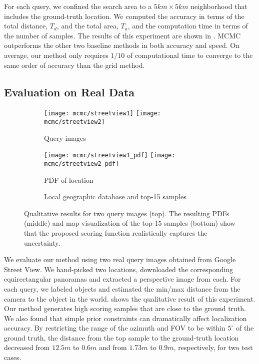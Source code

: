 For each query, we confined the search area to a $5km\times5km$ 
neighborhood that includes the ground-truth location. We computed the
accuracy in terms of the total distance, $T_d$, and the
total area, $T_a$, and the computation time in terms of
the number of samples. The results of this experiment are shown in
. MCMC outperforms the other two baseline methods
in both accuracy and speed. On average, our method only requires
$1/10$ of computational time to converge to the same order of accuracy
than the grid method.

\subsection{Evaluation on Real Data}
\label{sec:qualitative}

\begin{figure}
  
  \centering

  \begin{subfigure}{1\linewidth} 
    \centering
    \texttt{[image: mcmc/streetview1]}
    \texttt{[image: mcmc/streetview2]}
    \caption{Query images}
  \end{subfigure}
  \begin{subfigure}{1\linewidth} 
    \centering
    \texttt{[image: mcmc/streetview1\_pdf]}
    \texttt{[image: mcmc/streetview2\_pdf]}
    \caption{PDF of location}
  \end{subfigure}
  \begin{subfigure}{1\linewidth} 
    \centering
    \caption{Local geographic database and top-15 samples}
  \end{subfigure}

  \caption{Qualitative results for two query images (top). The
  resulting PDFs (middle) and map visualization of the top-15 samples
(bottom) show that the proposed scoring function realistically
captures the  uncertainty.}

 \label{fig:real-data}
\end{figure}

We evaluate our method using two real query images obtained from
Google Street View. We hand-picked two locations, downloaded the
corresponding equirectangular panoramas and extracted a perspective
image from each. For each query, we labeled objects and estimated the
min/max distance from the camera to the object in the world.
 shows the qualitative result of this experiment.
Our method generates high scoring samples that are close to the ground
truth. We also found that simple prior constraints can dramatically
affect localization accuracy. By restricting the range of the azimuth
and FOV to be within $5^\circ$ of the ground truth, the distance from
the top sample to the ground-truth location decreased from $12.5m$ to
$0.6m$ and from $1.73m$ to $0.9m$, respectively, for two test
cases.

